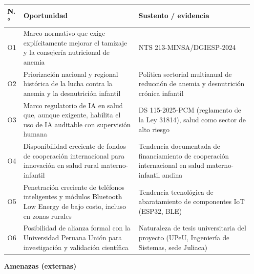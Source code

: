 \documentclass[11pt,a4paper]{article}
\begin{document}
{\small
\begin{longtable}[]{@{}
  >{\raggedright\arraybackslash}p{}
  >{\raggedright\arraybackslash}p{}
  >{\raggedright\arraybackslash}p{}@{}}
\toprule\noalign{}
\begin{minipage}[b]{\linewidth}\raggedright
N.°
\end{minipage} & \begin{minipage}[b]{\linewidth}\raggedright
Oportunidad
\end{minipage} & \begin{minipage}[b]{\linewidth}\raggedright
Sustento / evidencia
\end{minipage} \\
\midrule\noalign{}
\endhead
\bottomrule\noalign{}
\endlastfoot
O1 & Marco normativo que exige explícitamente mejorar el tamizaje y la consejería nutricional de anemia & NTS 213-MINSA/DGIESP-2024 \\
O2 & Priorización nacional y regional histórica de la lucha contra la anemia y la desnutrición infantil & Política sectorial multianual de reducción de anemia y desnutrición crónica infantil \\
O3 & Marco regulatorio de IA en salud que, aunque exigente, habilita el uso de IA auditable con supervisión humana & DS 115-2025-PCM (reglamento de la Ley 31814), salud como sector de alto riesgo \\
O4 & Disponibilidad creciente de fondos de cooperación internacional para innovación en salud rural materno-infantil & Tendencia documentada de financiamiento de cooperación internacional en salud materno-infantil andina \\
O5 & Penetración creciente de teléfonos inteligentes y módulos Bluetooth Low Energy de bajo costo, incluso en zonas rurales & Tendencia tecnológica de abaratamiento de componentes IoT (ESP32, BLE) \\
O6 & Posibilidad de alianza formal con la Universidad Peruana Unión para investigación y validación científica & Naturaleza de tesis universitaria del proyecto (UPeU, Ingeniería de Sistemas, sede Juliaca) \\
\end{longtable}
}

\textbf{Amenazas (externas)}
\end{document}

